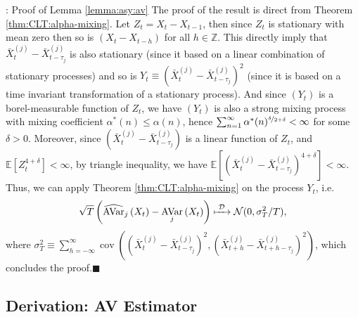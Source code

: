 \documentclass[envcountsect,usenames,dvipsnames]{beamer}
\DeclareMathOperator{\AV}{AVar}
\DeclareMathOperator*{\cov}{cov}
\theoremstyle{mystyle}
\begin{document}
\begin{frame}{\thesubsection: Proof of Lemma \ref{lemma:asy:av}}
\footnotesize
    The proof of the result is direct from Theorem \ref{thm:CLT:alpha-mixing}. Let $Z_t = X_t - X_{t-1}$, then since $Z_t$ is stationary with mean zero then so is $(X_t - X_{t-h})$ for all $h \in \mathbb{Z}$. This directly imply that $\bar{X}_{t}^{(j)} - \bar{X}_{t-\tau_j}^{(j)}$ is also stationary (since it based on a linear combination of stationary processes) and so is $Y_t \equiv (\bar{X}_{t}^{(j)} - \bar{X}_{t-\tau_j}^{(j)})^2$ (since it is based on a time invariant transformation of a stationary process). And since $(Y_t)$ is a borel-measurable function of $Z_t$, we have $(Y_t)$ is also a strong mixing process with mixing coefficient $\alpha^{\ast}(n) \leq \alpha(n)$, hence $\sum_{n=1}^{\infty} \alpha^{\ast}(n)^{\nicefrac{\delta}{2+\delta}} < \infty$ for some $\delta > 0$. Moreover, since $(\bar{X}_{t}^{(j)} - \bar{X}_{t-\tau_j}^{(j)})$ is a linear function of $Z_t$, and $\mathbb{E}\left[Z_t^{4+\delta}\right] < \infty$, by triangle inequality, we have $\mathbb{E}\left[(\bar{X}_{t}^{(j)} - \bar{X}_{t-\tau_j}^{(j)})^{4+\delta}\right] < \infty$.
    Thus, we can apply Theorem \ref{thm:CLT:alpha-mixing} on the process $Y_t$, i.e.
%
\begin{equation*}
    \sqrt{T}\left(\widehat{\AV}_j \left(X_t \right) - \AV_j \left(X_t \right) \right) \xmapsto[\;\;\;\;\; ]{\mathcal{D}} \mathcal{N}(0, \sigma^2_T/T),
\end{equation*}
%
where $\sigma^2_T \equiv \sum_{h = -\infty}^{\infty}\cov\left( \left(\bar{X}_{t}^{(j)} - \bar{X}_{t-\tau_j}^{(j)} \right)^2, \left(\bar{X}_{t+h}^{(j)} - \bar{X}_{t+h-\tau_j}^{(j)} \right)^2 \right)$, which concludes the proof.\hfill $\blacksquare$

\vspace{0.25cm}
\hyperlink{lemma:asy:av}{}

\end{frame}


\subsection{Derivation: AV Estimator}
\label{Derivation:av.estimator}
\end{document}
